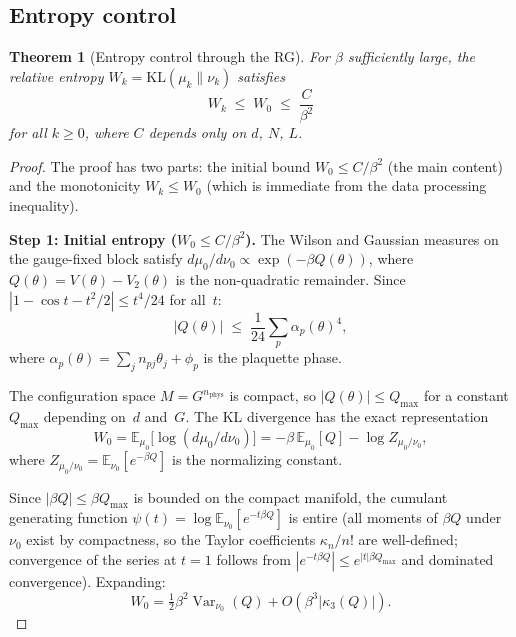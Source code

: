 \documentclass[11pt,a4paper]{article}
\theoremstyle{plain}
\newtheorem{theorem}{Theorem}[section]
\theoremstyle{definition}
\theoremstyle{remark}
\newcommand{\E}{\mathbb{E}}
\newcommand{\Var}{\operatorname{Var}}
\newcommand{\KL}{\mathrm{KL}}
\begin{document}
\subsection{Entropy control}

\begin{theorem}[Entropy control through the RG]
\label{thm:entropy}
For $\beta$ sufficiently large, the relative entropy
$W_k = \KL(\mu_k \| \nu_k)$ satisfies
\begin{equation}\label{eq:entropy_decay}
  W_k \;\leq\; W_0 \;\leq\; \frac{C}{\beta^2}
\end{equation}
for all $k \geq 0$, where $C$ depends only on $d$,
$N$, $L$.
\end{theorem}

\begin{proof}
The proof has two parts: the initial bound $W_0 \leq
C/\beta^2$ (the main content) and the monotonicity
$W_k \leq W_0$ (which is immediate from the data
processing inequality).

\smallskip
\noindent\textbf{Step 1: Initial entropy
($W_0 \leq C/\beta^2$).}
The Wilson and Gaussian measures on the gauge-fixed
block satisfy
$d\mu_0/d\nu_0 \propto \exp(-\beta Q(\theta))$,
where $Q(\theta) = V(\theta) - V_2(\theta)$ is the
non-quadratic remainder.  Since
$|1 - \cos t - t^2/2| \leq t^4/24$ for all~$t$:
\begin{equation}\label{eq:Q_bound}
  |Q(\theta)| \;\leq\; \frac{1}{24}\sum_p
  \alpha_p(\theta)^4,
\end{equation}
where $\alpha_p(\theta) = \sum_j n_{pj}\theta_j
+ \phi_p$ is the plaquette phase.

The configuration space $M = G^{n_{\mathrm{phys}}}$
is compact, so $|Q(\theta)| \leq Q_{\max}$ for a
constant $Q_{\max}$ depending on~$d$ and~$G$.
The KL divergence has the exact representation
\begin{equation}\label{eq:W0_exact}
  W_0 = \E_{\mu_0}\bigl[\log(d\mu_0/d\nu_0)\bigr]
  = -\beta\,\E_{\mu_0}[Q]
  - \log Z_{\mu_0/\nu_0},
\end{equation}
where $Z_{\mu_0/\nu_0} = \E_{\nu_0}[e^{-\beta Q}]$
is the normalizing constant.

Since $|\beta Q| \leq \beta Q_{\max}$ is bounded on the
compact manifold, the cumulant generating function
$\psi(t) = \log\E_{\nu_0}[e^{-t\beta Q}]$
is entire (all moments of $\beta Q$ under $\nu_0$ exist
by compactness, so the Taylor coefficients
$\kappa_n/n!$ are well-defined; convergence of the
series at $t = 1$ follows from
$|e^{-t\beta Q}| \leq e^{|t|\beta Q_{\max}}$ and
dominated convergence).
Expanding:
\begin{equation}
  W_0 = \tfrac{1}{2}\beta^2\Var_{\nu_0}(Q)
  + O(\beta^3|\kappa_3(Q)|).
\end{equation}


\end{proof}
\end{document}
